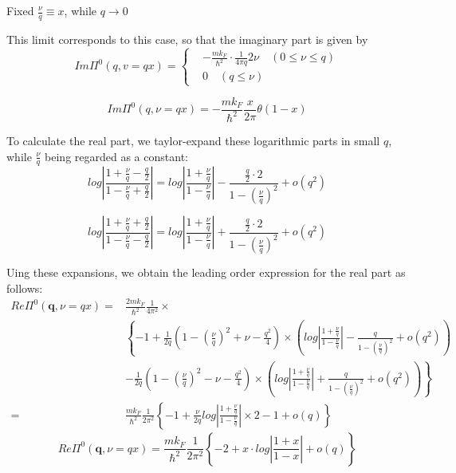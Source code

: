 \begin{itemize}
\begin{center}Fixed $\frac{\nu}{q} \equiv x$, while $q\rightarrow 0$ \end{center}

This limit corresponds to this case, so that the imaginary part is given by
\[ Im\Pi^0(q,v=q x) = \left\{ \begin{split}&-\frac{m k_F}{\hbar^2} \cdot \frac{1}{4\pi q} 2\nu \quad (0\leq \nu \leq q)\\
&0 \quad (q \leq \nu) \end{split} \right. \]

\begin{equation*} \label{Eqs2.8.27.a} \tag{2.8.27.a}
Im \Pi^0(q,\nu=q x) = -\frac{m k_F}{\hbar^2}\frac{x}{2\pi} \theta(1-x)
\end{equation*}
\setcounter{equation}{27}

To calculate the real part, we taylor-expand these logarithmic parts in small $q$, while $\frac{\nu}{q}$ being regarded as a constant:
\[log\left| \frac{1+\frac{\nu}{q}-\frac{q}{2}}{1-\frac{\nu}{q}+\frac{q}{2}} \right| = log \left| \frac{1+\frac{\nu}{q}}{1-\frac{\nu}{q}} \right| - \frac{\frac{q}{2}\cdot 2}{1-(\frac{\nu}{q})^2} + o(q^2)\]

\[log\left| \frac{1+\frac{\nu}{q}+\frac{q}{2}}{1-\frac{\nu}{q}-\frac{q}{2}} \right| = log \left| \frac{1+\frac{\nu}{q}}{1-\frac{\nu}{q}} \right| + \frac{\frac{q}{2}\cdot 2}{1-(\frac{\nu}{q})^2} + o(q^2)\]

Uing these expansions, we obtain the leading order expression for the real part as follows:
\[ \begin{split}Re\Pi^0(\mathbf{q},\nu=q x) =& \frac{2m k_F}{\hbar^2} \frac{1}{4\pi^2} \times\\
&\left\{ -1 + \frac{1}{2q}\left( 1-(\frac{\nu}{q})^2+\nu-\frac{q^2}{4} \right) \times \left( log \left| \frac{1+\frac{\nu}{q}}{1-\frac{\nu}{q}} \right| - \frac{q}{1-(\frac{\nu}{q})^2} + o(q^2) \right) \right.\\
&\left.-\frac{1}{2q}\left( 1-(\frac{\nu}{q})^2-\nu-\frac{q^2}{4} \right) \times \left( log \left| \frac{1+\frac{\nu}{q}}{1-\frac{\nu}{q}} \right| + \frac{q}{1-(\frac{\nu}{q})^2} + o(q^2) \right)\right\}\\
=&\frac{m k_F}{\hbar^2} \frac{1}{2\pi^2}\left\{ -1 + \frac{\nu}{2q}log\left| \frac{1+\frac{\nu}{q}}{1-\frac{\nu}{q}} \right| \times 2 - 1 + o(q) \right\}
\end{split}\]
\begin{equation*} \label{Eqs2.8.27.b} \tag{2.8.27.b}
Re\Pi^0(\mathbf{q},\nu=q x)=\frac{m k_F}{\hbar^2} \frac{1}{2\pi^2} \left\{ -2 + x\cdot log\left| \frac{1+x}{1-x} \right|+ o(q) \right\}
\end{equation*}
\end{itemize}

